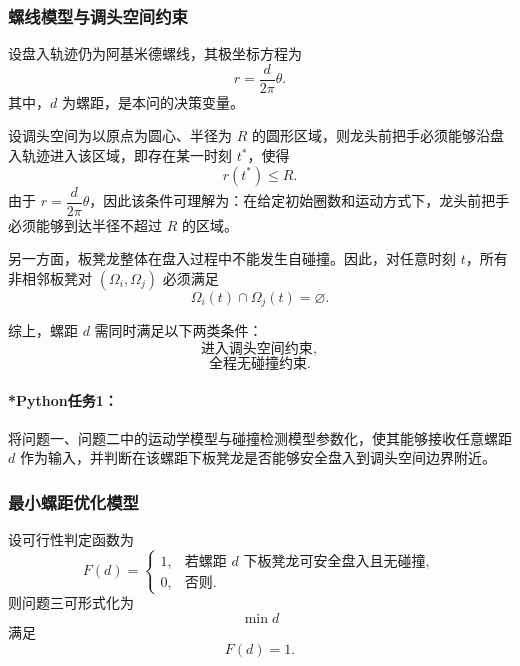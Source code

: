 \documentclass[12pt,a4paper]{ctexart}
\begin{document}
\subsubsection{螺线模型与调头空间约束}
设盘入轨迹仍为阿基米德螺线，其极坐标方程为
\begin{equation}
r=\frac{d}{2\pi}\theta.
\end{equation}
其中，$d$ 为螺距，是本问的决策变量。

设调头空间为以原点为圆心、半径为 $R$ 的圆形区域，则龙头前把手必须能够沿盘入轨迹进入该区域，即存在某一时刻 $t^\ast$，使得
\begin{equation}
r(t^\ast)\le R.
\end{equation}
由于 $r=\dfrac{d}{2\pi}\theta$，因此该条件可理解为：在给定初始圈数和运动方式下，龙头前把手必须能够到达半径不超过 $R$ 的区域。

另一方面，板凳龙整体在盘入过程中不能发生自碰撞。因此，对任意时刻 $t$，所有非相邻板凳对 $(\Omega_i,\Omega_j)$ 必须满足
\begin{equation}
\Omega_i(t)\cap\Omega_j(t)=\varnothing.
\end{equation}

综上，螺距 $d$ 需同时满足以下两类条件：
\begin{equation}
\text{进入调头空间约束},
\end{equation}
\begin{equation}
\text{全程无碰撞约束}.
\end{equation}

\paragraph{*Python任务1：}
将问题一、问题二中的运动学模型与碰撞检测模型参数化，使其能够接收任意螺距 $d$ 作为输入，并判断在该螺距下板凳龙是否能够安全盘入到调头空间边界附近。

\subsubsection{最小螺距优化模型}
设可行性判定函数为
\begin{equation}
F(d)=
\begin{cases}
1, & \text{若螺距 } d \text{ 下板凳龙可安全盘入且无碰撞},\\
0, & \text{否则}.
\end{cases}
\end{equation}
则问题三可形式化为
\begin{equation}
\min d
\end{equation}
满足
\begin{equation}
F(d)=1.
\end{equation}
\end{document}
